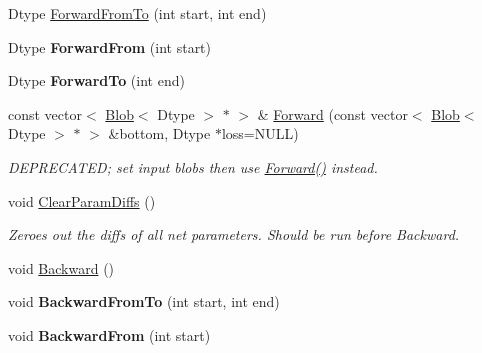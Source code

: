 \begin{DoxyCompactItemize}
Dtype \mbox{\hyperlink{classcaffe_1_1_net_ae5354c03371d4cb7b18988561790e676}{Forward\+From\+To}} (int start, int end)
\item 
\mbox{\label{classcaffe_1_1_net_a7da4abdebcea6a65ca61ef6afb61665f}} 
Dtype {\bfseries Forward\+From} (int start)
\item 
\mbox{\label{classcaffe_1_1_net_a9e78782abd9080626ad13daac3abf896}} 
Dtype {\bfseries Forward\+To} (int end)
\item 
\mbox{\label{classcaffe_1_1_net_ac78806e7aa069439622de4177323c46c}} 
const vector$<$ \mbox{\hyperlink{classcaffe_1_1_blob}{Blob}}$<$ Dtype $>$ $\ast$ $>$ \& \mbox{\hyperlink{classcaffe_1_1_net_ac78806e7aa069439622de4177323c46c}{Forward}} (const vector$<$ \mbox{\hyperlink{classcaffe_1_1_blob}{Blob}}$<$ Dtype $>$ $\ast$ $>$ \&bottom, Dtype $\ast$loss=N\+U\+LL)
\begin{DoxyCompactList}\small\item\em D\+E\+P\+R\+E\+C\+A\+T\+ED; set input blobs then use \mbox{\hyperlink{classcaffe_1_1_net_a6f6cf9d40637f7576828d856bb1b1826}{Forward()}} instead. \end{DoxyCompactList}\item 
\mbox{\label{classcaffe_1_1_net_a3d251c397f812a6d8e162db3a82bb198}} 
void \mbox{\hyperlink{classcaffe_1_1_net_a3d251c397f812a6d8e162db3a82bb198}{Clear\+Param\+Diffs}} ()
\begin{DoxyCompactList}\small\item\em Zeroes out the diffs of all net parameters. Should be run before Backward. \end{DoxyCompactList}\item 
void \mbox{\hyperlink{classcaffe_1_1_net_a7a1a6d17347106dd1284b1b6d28cb4e9}{Backward}} ()
\item 
\mbox{\label{classcaffe_1_1_net_a4cbe2e5f4bdde638fb16568b629526dd}} 
void {\bfseries Backward\+From\+To} (int start, int end)
\item 
\mbox{\label{classcaffe_1_1_net_a36843d26a781f42df9ac5852187df03b}} 
void {\bfseries Backward\+From} (int start)
\item 
\mbox{\label{classcaffe_1_1_net_a1c2d3c2909120250cc29cc98401e39d8}} 

\end{DoxyCompactItemize}
